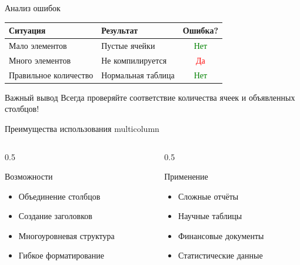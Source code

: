 \documentclass[aspectratio=169]{beamer}
\begin{document}
\begin{frame}{Анализ ошибок}
    \begin{center}
    \begin{tabular}{|l|l|c|}
    \hline
    \textbf{Ситуация} & \textbf{Результат} & \textbf{Ошибка?} \\
    \hline
    Мало элементов & Пустые ячейки & \textcolor{green}{Нет} \\
    \hline
    Много элементов & Не компилируется & \textcolor{red}{Да} \\
    \hline
    Правильное количество & Нормальная таблица & \textcolor{green}{Нет} \\
    \hline
    \end{tabular}
    \end{center}
    
    \vspace{0.5cm}
    
    \begin{alertblock}{Важный вывод}
        Всегда проверяйте соответствие количества ячеек и объявленных столбцов!
    \end{alertblock}
\end{frame}

\begin{frame}{Преимущества использования multicolumn}
    \begin{columns}[T]
        \begin{column}{0.5\textwidth}
            \begin{block}{Возможности}
                \begin{itemize}
                    \item Объединение столбцов
                    \item Создание заголовков
                    \item Многоуровневая структура
                    \item Гибкое форматирование
                \end{itemize}
            \end{block}
        \end{column}
        
        \begin{column}{0.5\textwidth}
            \begin{exampleblock}{Применение}
                \begin{itemize}
                    \item Сложные отчёты
                    \item Научные таблицы
                    \item Финансовые документы
                    \item Статистические данные
                \end{itemize}
            \end{exampleblock}
        \end{column}
    \end{columns}
\end{frame}
\end{document}
